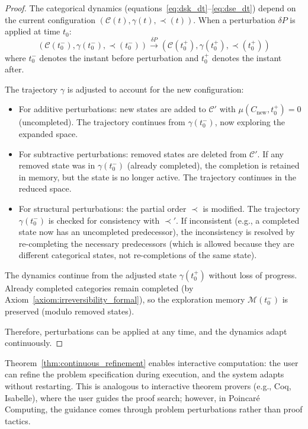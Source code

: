\begin{proof}
The categorical dynamics (equations~\eqref{eq:dsk_dt}--\eqref{eq:dse_dt}) depend on the current configuration $(\mathcal{C}(t), \gamma(t), \prec(t))$. When a perturbation $\delta P$ is applied at time $t_0$:
\begin{equation}
(\mathcal{C}(t_0^-), \gamma(t_0^-), \prec(t_0^-)) \xrightarrow{\delta P} (\mathcal{C}(t_0^+), \gamma(t_0^+), \prec(t_0^+))
\end{equation}
where $t_0^-$ denotes the instant before perturbation and $t_0^+$ denotes the instant after.

The trajectory $\gamma$ is adjusted to account for the new configuration:
\begin{itemize}
    \item For additive perturbations: new states are added to $\mathcal{C}'$ with $\mu(C_{\text{new}}, t_0^+) = 0$ (uncompleted). The trajectory continues from $\gamma(t_0^-)$, now exploring the expanded space.
    
    \item For subtractive perturbations: removed states are deleted from $\mathcal{C}'$. If any removed state was in $\gamma(t_0^-)$ (already completed), the completion is retained in memory, but the state is no longer active. The trajectory continues in the reduced space.
    
    \item For structural perturbations: the partial order $\prec$ is modified. The trajectory $\gamma(t_0^-)$ is checked for consistency with $\prec'$. If inconsistent (e.g., a completed state now has an uncompleted predecessor), the inconsistency is resolved by re-completing the necessary predecessors (which is allowed because they are different categorical states, not re-completions of the same state).
\end{itemize}

The dynamics continue from the adjusted state $\gamma(t_0^+)$ without loss of progress. Already completed categories remain completed (by Axiom~\ref{axiom:irreversibility_formal}), so the exploration memory $\mathcal{M}(t_0^-)$ is preserved (modulo removed states).

Therefore, perturbations can be applied at any time, and the dynamics adapt continuously.
\end{proof}

\begin{remark}
\label{rem:interactive_computation}
Theorem~\ref{thm:continuous_refinement} enables interactive computation: the user can refine the problem specification during execution, and the system adapts without restarting. This is analogous to interactive theorem provers (e.g., Coq, Isabelle), where the user guides the proof search; however, in Poincaré Computing, the guidance comes through problem perturbations rather than proof tactics.
\end{remark}


